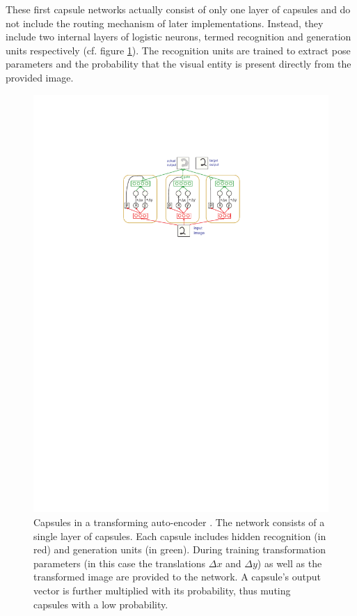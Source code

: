 These first capsule networks actually consist of only one layer of capsules and do not include the routing mechanism of later implementations. Instead, they include two internal layers of logistic neurons, termed recognition and generation units respectively (cf. figure \ref{fig:auto-encoders}). The recognition units are trained to extract pose parameters and the probability that the visual entity is present directly from the provided image.
\begin{figure}[H]
    \centering
    \includegraphics[width=.69\textwidth]{figures/caps-fig1.pdf}
\caption[Capsules in a transforming auto-encoders]{Capsules in a transforming auto-encoder \cite{hinton2011transforming}. The network consists of a single layer of capsules. Each capsule includes hidden recognition (in red) and generation units (in green). During training transformation parameters (in this case the translations $\Delta x$ and $\Delta y$) as well as the transformed image are provided to the network. A capsule's output vector is further multiplied with its probability, thus muting capsules with a low probability.}\label{fig:auto-encoders}
\end{figure}\noindent
